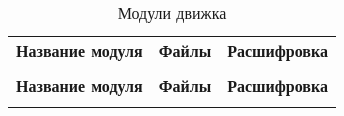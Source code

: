 \begin{centering}
    \begin{longtable}{|l|l|l|}
        \caption{Модули движка} \label{enginemodules}                                                                                                                                                                                                                            \\

        \hline \multicolumn{1}{|c|}{\textbf{Название модуля}} & \multicolumn{1}{c|}{\textbf{Файлы}}                                                                                            & \multicolumn{1}{c|}{\textbf{Расшифровка}}                                       \\ \hhline{|=|=|=|}
        \endfirsthead

        \multicolumn{3}{c}%
        {\hspace{-12.5cm}{Окончание таблицы \thetable} \vspace{1ex}}                                                                                                                                                                                                             \\
        \hline \multicolumn{1}{|c|}{\textbf{Название модуля}} & \multicolumn{1}{c|}{\textbf{Файлы}}                                                                                            & \multicolumn{1}{c|}{\textbf{Расшифровка}}                                       \\ \hhline{|=|=|=|}
        \endhead

        \hline
        \endfoot


\end{longtable}
\end{centering}
